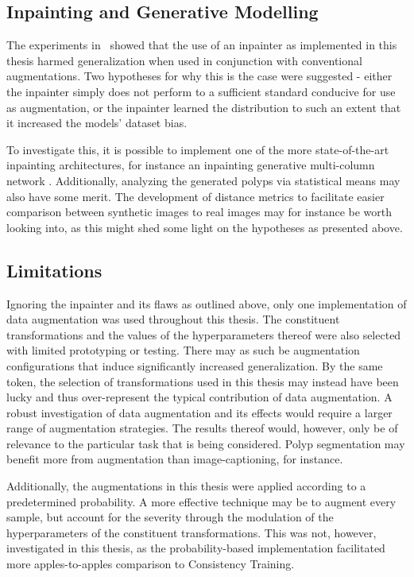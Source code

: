 \subsection{Inpainting and Generative Modelling}

The experiments in~ showed that the use of an inpainter as implemented in this thesis harmed generalization when used in conjunction with conventional augmentations. Two hypotheses for why this is the case were suggested - either the inpainter simply does not perform to a sufficient standard conducive for use as augmentation, or the inpainter learned the distribution to such an extent that it increased the models' dataset bias. 

To investigate this, it is possible to implement one of the more state-of-the-art inpainting architectures, for instance an inpainting generative multi-column network \cite{inpainter_better}. Additionally, analyzing the generated polyps via statistical means may also have some merit. The development of distance metrics to facilitate easier comparison between synthetic images to real images may for instance be worth looking into, as this might shed some light on the hypotheses as presented above.

\subsection{Limitations}
    Ignoring the inpainter and its flaws as outlined above, only one implementation of data augmentation was used throughout this thesis. The constituent transformations and the values of the hyperparameters thereof were also selected with limited prototyping or testing. There may as such be augmentation configurations that induce significantly increased generalization. By the same token, the selection of transformations used in this thesis may instead have been lucky and thus over-represent the typical contribution of data augmentation. A robust investigation of data augmentation and its effects would require a larger range of augmentation strategies. The results thereof would, however, only be of relevance to the particular task that is being considered. Polyp segmentation may benefit more from augmentation than image-captioning, for instance. 
    
    Additionally, the augmentations in this thesis were applied according to a predetermined probability. A more effective technique may be to augment every sample, but account for the severity through the modulation of the hyperparameters of the constituent transformations. This was not, however, investigated in this thesis, as the probability-based implementation facilitated more apples-to-apples comparison to Consistency Training. 

